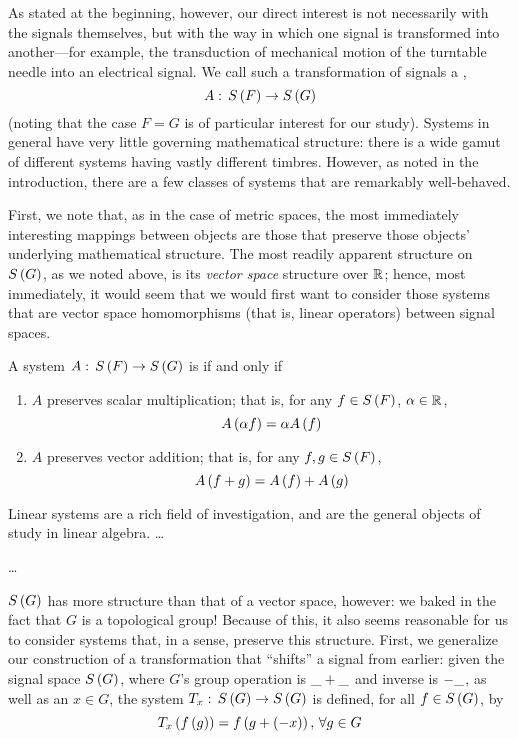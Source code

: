 As stated at the beginning, however, our direct interest is not necessarily with the signals themselves, but with the way in which one signal is transformed into another---for example, the transduction of mechanical motion of the turntable needle into an electrical signal. We call such a transformation of signals a ,
\[ A: \, S\left( F \right) \to S\left( G \right) \]
(noting that the case $F = G$ is of particular interest for our study). Systems in general have very little governing mathematical structure: there is a wide gamut of different systems having vastly different timbres. However, as noted in the introduction, there are a few classes of systems that are remarkably well-behaved.

First, we note that, as in the case of metric spaces, the most immediately interesting mappings between objects are those that preserve those objects' underlying mathematical structure. The most readily apparent structure on $S\left( G \right)$, as we noted above, is its \emph{vector space} structure over $\mathbb{R}$; hence, most immediately, it would seem that we would first want to consider those systems that are vector space homomorphisms (that is, linear operators) between signal spaces.
\begin{definition}
A system $A: \, S\left( F \right) \to S\left( G \right)$ is  if and only if
\begin{enumerate}
    \item $A$ preserves scalar multiplication; that is, for any $f \in S\left( F \right)$, $\alpha \in \mathbb{R}$,
    \[ A\left( \alpha f \right) = \alpha A\left( f \right) \]
    \item $A$ preserves vector addition; that is, for any $f,g \in S\left( F \right)$,
    \[ A\left( f + g \right) = A\left( f \right) + A\left( g \right) \]
\end{enumerate}
\end{definition}

Linear systems are a rich field of investigation, and are the general objects of study in linear algebra. \ldots

\ldots

$S\left( G \right)$ has more structure than that of a vector space, however: we baked in the fact that $G$ is a topological group! Because of this, it also seems reasonable for us to consider systems that, in a sense, preserve this structure. First, we generalize our construction of a transformation that ``shifts'' a signal from earlier: given the signal space $S\left( G \right)$, where $G$'s group operation is $\_ + \_$ and inverse is $- \_$, as well as an $x \in G$, the  system $T_x: \, S\left( G \right) \to S\left( G \right)$ is defined, for all $f \in S\left( G \right)$, by
\[ T_x\left( f\left( g \right) \right) = f\left( g + (-x) \right),\,\forall g \in G \]

